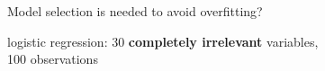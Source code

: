\documentclass[english,t]{beamer}
\begin{document}

\begin{frame}{Model selection is needed to avoid overfitting?}

  logistic regression: 30 \textbf{completely irrelevant} variables, \\100
  observations
  

\end{frame}
\end{document}
